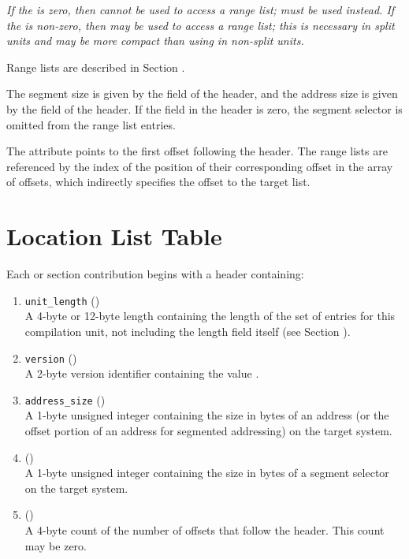 \textit{
If the \HFNoffsetentrycount{} is zero, then \DWFORMrnglistx{} cannot 
be used to access a range list; \DWFORMsecoffset{} must be used 
instead. If the \HFNoffsetentrycount{} is non-zero, then \DWFORMrnglistx{} 
may be used to access a range list; this is necessary in split units and
may be more compact than using \DWFORMsecoffset{} in non-split units.}

Range lists are
described in Section .

The segment size is given by the
\HFNsegmentselectorsize{} field of the header, and the address size is
given by the  field of the header. If the
\HFNsegmentselectorsize{} field in the header is zero, the segment
selector is omitted from the range list entries.

The \DWATrnglistsbase{} attribute points to the first offset 
following the header. The range lists are referenced
by the index of the position of their corresponding offset in the
array of offsets, which indirectly specifies the offset to the
target list.
 
\section{Location List Table}
\label{datarep:locationlisttable}
Each \dotdebugloclists{} or \dotdebugloclistsdwo{} section
\bb
contribution
\eb
begins with a header containing:
\begin{enumerate}[1. ]
\item \texttt{unit\_length} () \\
A 4-byte or 12-byte length containing the length of
the set of entries for this compilation unit, not
including the length field itself
\bb
(see Section ).
\eb

\item  \texttt{version} (\HFTuhalf) \\
A 2-byte version identifier containing the value
\versiondotdebugloclists{}.

\item	\texttt{address\_size} (\HFTubyte) \\
A 1-byte unsigned integer containing the size in
bytes of an address (or the offset portion of an
address for segmented addressing) on the target
system.

\item	\HFNsegmentselectorsize{} (\HFTubyte) \\
A 1-byte unsigned integer containing the size in
bytes of a segment selector on the target system.

\item   \HFNoffsetentrycount{} (\HFTuword) \\
A 4-byte count of the number of offsets
that follow the header. This count may be zero.
\end{enumerate}

